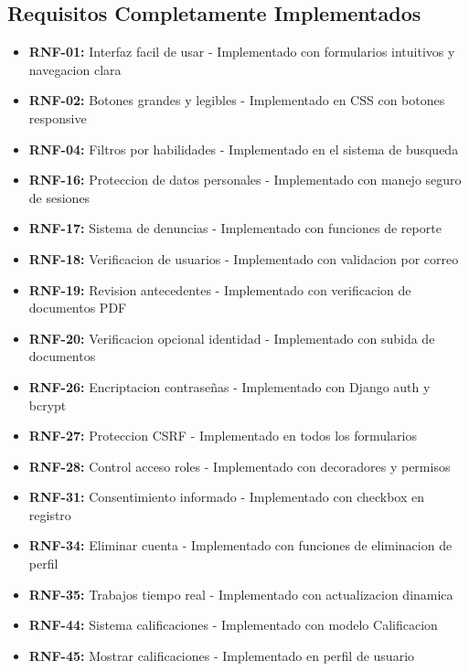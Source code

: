 \documentclass[12pt, a4paper]{article}
\begin{document}
\begin{itemize}
\subsection{Requisitos Completamente Implementados}
\begin{itemize}
    \item \textbf{RNF-01:} Interfaz facil de usar - Implementado con formularios intuitivos y navegacion clara
    \item \textbf{RNF-02:} Botones grandes y legibles - Implementado en CSS con botones responsive
    \item \textbf{RNF-04:} Filtros por habilidades - Implementado en el sistema de busqueda
    \item \textbf{RNF-16:} Proteccion de datos personales - Implementado con manejo seguro de sesiones
    \item \textbf{RNF-17:} Sistema de denuncias - Implementado con funciones de reporte
    \item \textbf{RNF-18:} Verificacion de usuarios - Implementado con validacion por correo
    \item \textbf{RNF-19:} Revision antecedentes - Implementado con verificacion de documentos PDF
    \item \textbf{RNF-20:} Verificacion opcional identidad - Implementado con subida de documentos
    \item \textbf{RNF-26:} Encriptacion contraseñas - Implementado con Django auth y bcrypt
    \item \textbf{RNF-27:} Proteccion CSRF - Implementado en todos los formularios
    \item \textbf{RNF-28:} Control acceso roles - Implementado con decoradores y permisos
    \item \textbf{RNF-31:} Consentimiento informado - Implementado con checkbox en registro
    \item \textbf{RNF-34:} Eliminar cuenta - Implementado con funciones de eliminacion de perfil
    \item \textbf{RNF-35:} Trabajos tiempo real - Implementado con actualizacion dinamica
    \item \textbf{RNF-44:} Sistema calificaciones - Implementado con modelo Calificacion
    \item \textbf{RNF-45:} Mostrar calificaciones - Implementado en perfil de usuario
\end{itemize}


\end{itemize}
\end{document}
